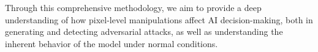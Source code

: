 \documentclass[10pt, conference, a4paper, final]{IEEEtran}
\begin{document}
Through this comprehensive methodology, we aim to provide a deep understanding of how pixel-level manipulations affect AI decision-making, 
both in generating and detecting adversarial attacks, as well as understanding the inherent behavior of the model under normal conditions.

    
    
    
    

    
    
    
    
        
        
        
\end{document}
